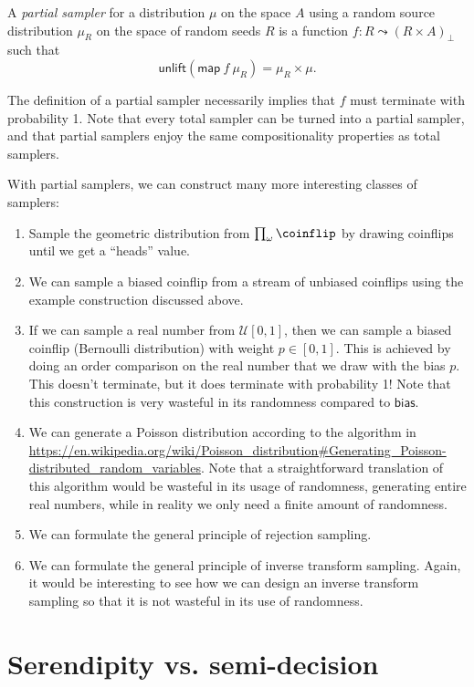 \begin{definition}
A \emph{partial sampler} for a distribution $\mu$ on the space $A$ using a random source distribution $\mu_R$ on the space of random seeds $R$ is a function $ f : R \leadsto \left(R \times A \right)_\bot$ such that
\[
 \mathsf{unlift}\left(\mathsf{map}\ f \ \mu_R\right) = \mu_R \times \mu.
\]
\end{definition}

The definition of a partial sampler necessarily implies that $f$ must terminate with probability 1. Note that every total sampler can be turned into a partial sampler, and that partial samplers enjoy the same compositionality properties as total samplers.

With partial samplers, we can construct many more interesting classes of samplers:

\begin{enumerate}
\item Sample the geometric distribution from $\prod_\omega \coinflip$ by drawing coinflips until we get a ``heads'' value.
\item We can sample a biased coinflip from a stream of unbiased coinflips using the example construction discussed above.
\item If we can sample a real number from $\mathcal{U}[0,1]$, then we can sample a biased coinflip (Bernoulli distribution) with weight $p \in [0,1]$. This is achieved by doing an order comparison on the real number that we draw with the bias $p$. This doesn't terminate, but it does terminate with probability 1! Note that this construction is very wasteful in its randomness compared to $\mathsf{bias}$.
\item We can generate a Poisson distribution according to the algorithm in \url{https://en.wikipedia.org/wiki/Poisson_distribution#Generating_Poisson-distributed_random_variables}. Note that a straightforward translation of this algorithm would be wasteful in its usage of randomness, generating entire real numbers, while in reality we only need a finite amount of randomness.
\item We can formulate the general principle of rejection sampling.
\item We can formulate the general principle of inverse transform sampling. Again, it would be interesting to see how we can design an inverse transform sampling so that it is not wasteful in its use of randomness.
\end{enumerate}

\section{Serendipity vs. semi-decision}

